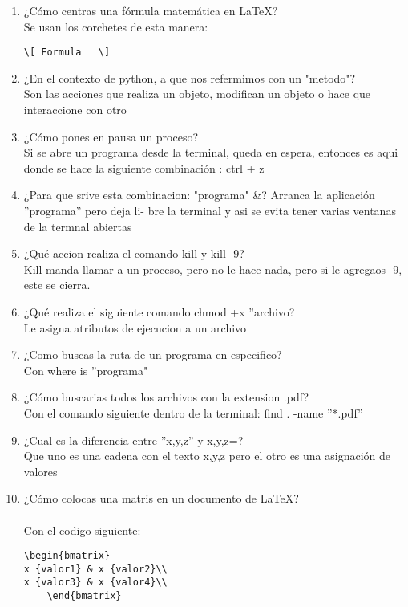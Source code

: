 \documentclass{book}
\begin{document}
\begin{enumerate}
	\item ¿Cómo centras una fórmula matemática en \LaTeX?\\
	Se usan los corchetes de esta manera:  \begin{lstlisting}
\[ Formula   \]
	\end{lstlisting}
	
	\item ¿En el contexto de python, a que nos refermimos con un "metodo"?\\
	Son las acciones que realiza un objeto, modifican un
	objeto o hace que interaccione con otro
	
	\item ¿Cómo pones en pausa un proceso?\\
	Si se abre un programa desde la terminal, queda en espera, entonces es aqui donde se hace la siguiente combinación : ctrl + z
	
	\item ¿Para que srive esta combinacion: "programa" \&?
	Arranca la aplicación ”programa” pero deja li-
	bre la terminal y asi se evita tener varias ventanas de la termnal
	abiertas
	\item ¿Qué accion realiza el comando kill y kill -9?\\
	Kill manda llamar a un proceso, pero no le hace nada, pero si le agregaos -9, este se cierra.
	\item ¿Qué realiza el siguiente comando chmod +x ”archivo?\\
	Le asigna atributos de ejecucion a un archivo
	
	\item ¿Como buscas la ruta de un programa en especifico?\\
	Con where is ”programa"
	
	\item ¿Cómo buscarias todos los archivos con la extension .pdf?\\
	Con el comando siguiente dentro de la terminal: find . -name ”*.pdf”
	
	\item ¿Cual es la diferencia entre ”x,y,z” y x,y,z=?\\
	Que uno es una cadena con el texto x,y,z pero el otro es una asignación de valores
	
	\item ¿Cómo colocas una matris en un documento de \LaTeX?\\
	\\
	Con el codigo siguiente:
	\begin{verbatim} 
\begin{bmatrix}
x {valor1} & x {valor2}\\
x {valor3} & x {valor4}\\
	\end{bmatrix}
	\end{verbatim}
	

\end{enumerate}
\end{document}
